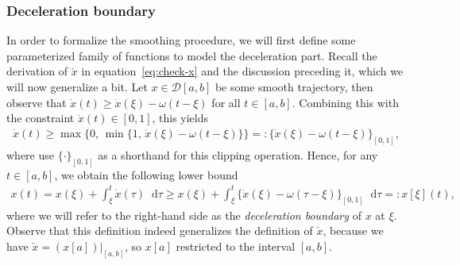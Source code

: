 \documentclass[a4paper]{article}
\theoremstyle{definition}
\theoremstyle{plain}
\newcommand*\diff{\mathop{}\!\mathrm{d}}
\begin{document}
\subsubsection{Deceleration boundary}\label{sec:deceleration-boundary}
In order to formalize the smoothing procedure, we will first define some
parameterized family of functions to model the deceleration part.
%
Recall the derivation of $\check{x}$ in equation~\eqref{eq:check-x} and the discussion
preceding it, which we will now generalize a bit.
%
Let $x \in \mathcal{D}[a, b]$ be some smooth trajectory, then observe that $\dot{x}(t) \geq \dot{x}(\xi) - \omega(t - \xi)$ for all $t \in [a, b]$.
Combining this with the constraint $\dot{x}(t) \in [0, 1]$, this yields
\begin{align}
  \dot{x}(t) \geq \max\{ 0, \, \min\{1, \, \dot{x}(\xi) - \omega (t - \xi) \}\} =: \{\dot{x}(\xi) - \omega(t-\xi)\}_{[0,1]} ,
\end{align}
where use $\{ \cdot \}_{[0,1]}$ as a shorthand for this clipping operation.
%
Hence, for any $t \in [a,b]$, we obtain the following lower bound
\begin{align}\label{eq:deceleration-boundary}
  x(t) = x(\xi) + \int_{\xi}^{t} \dot{x}(\tau) \diff \tau \geq x(\xi) + \int_{\xi}^{t} \{\dot{x}(\xi) - \omega(\tau - \xi)\}_{[0,1]} \diff \tau =: x[\xi] (t) ,
\end{align}
where we will refer to the right-hand side as the \emph{deceleration boundary} of $x$
at $\xi$.
%
Observe that this definition indeed generalizes the definition of $\check{x}$,
because we have $\check{x}=(x[a])|_{[a,b]}$, so $x[a]$ restricted to the
interval $[a,b]$.
\end{document}
